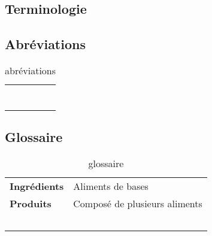 \textcolor[RGB]{46, 116, 181}{\chapter{Terminologie}}
\section{Abréviations}
\begin{table}[!h]
\begin{tabular}{p{2.5cm}p{13.5cm}}
  &\\
  &\\
  &\\
  &\\
  &\\
  &\\
  &\\
\end{tabular}
\caption{abréviations}
\end{table}

\section{Glossaire}
\begin{table}[!h]
\begin{tabular}{lp{13.5cm}}
  \textbf{Ingrédients} & Aliments de bases \\
  \textbf{Produits} & Composé de plusieurs aliments \\
  &\\
  &\\
  &\\
  &\\
  &\\
\end{tabular}
\caption{glossaire}
\end{table}
\printglossaries

